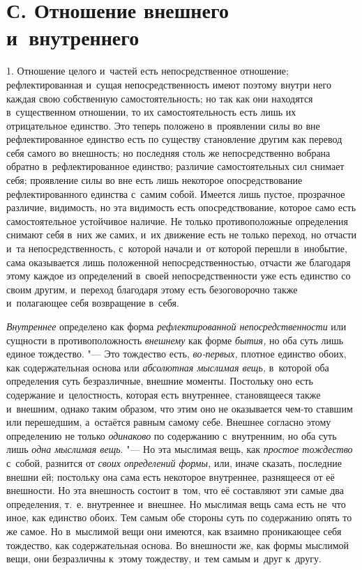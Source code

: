 \section[С. Отношение внешнего и~внутреннего]
{С. Отношение внешнего и~внутреннего}

1. Отношение целого и~частей есть
непосредственное отношение; рефлектированная и~сущая непосредственность
имеют поэтому внутри него каждая свою собственную самостоятельность; но так
как они находятся в~существенном отношении, то их самостоятельность есть
лишь их отрицательное единство. Это теперь положено в~проявлении силы во
вне рефлектированное единство есть по существу становление другим как
перевод себя самого во внешность; но последняя столь же непосредственно
вобрана обратно в~рефлектированное единство; различие самостоятельных сил
снимает себя; проявление силы во вне есть лишь некоторое опосредствование
рефлектированного единства с~самим собой. Имеется лишь пустое, прозрачное
различие, видимость, но эта видимость есть опосредствование, которое само
есть самостоятельное устойчивое наличие. Не только противоположные
определения снимают себя в~них же самих, и~их движение есть не только
переход, но отчасти и~та непосредственность, с~которой начали и~от которой
перешли в~инобытие, сама оказывается лишь положенной непосредственностью,
отчасти же благодаря этому каждое из определений в~своей непосредственности
уже есть единство со своим другим, и~переход благодаря этому есть
безоговорочно также и~полагающее себя возвращение в~себя.

{\em Внутреннее} определено как форма
{\em рефлектированной непосредственности} или сущности
в противоположность {\em внешнему} как форме
{\em бытия,} но оба суть лишь единое тождество. "--- Это
тождество есть, {\em во-первых,} плотное единство
обоих, как содержательная основа или {\em абсолютная
мыслимая вещь,} в~которой оба определения суть безразличные, внешние
моменты. Постольку оно есть содержание и~целостность, которая есть
внутреннее, становящееся также и~внешним, однако таким образом, что этим
оно не оказывается чем-то ставшим или перешедшим, а~остаётся равным самому
себе. Внешнее согласно этому определению не только
{\em одинаково} по содержанию с~внутренним, но оба суть
лишь {\em одна мыслимая вещь}. "--- Но эта мыслимая вещь,
как {\em простое тождество} с~собой, разнится от
{\em своих определений формы,} или, иначе сказать,
последние внешни ей; постольку она сама есть некоторое внутреннее,
разнящееся от её внешности. Но эта внешность состоит в~том, что её
составляют эти самые два определения, т.~е. внутреннее и~внешнее. Но
мыслимая вещь сама есть не~что иное, как единство обоих. Тем самым обе
стороны суть по содержанию опять то же самое. Но в~мыслимой вещи они
имеются, как взаимно проникающее себя тождество, как содержательная основа.
Во внешности же, как формы мыслимой вещи, они безразличны к~этому
тождеству, и~тем самым и~друг к~другу.

